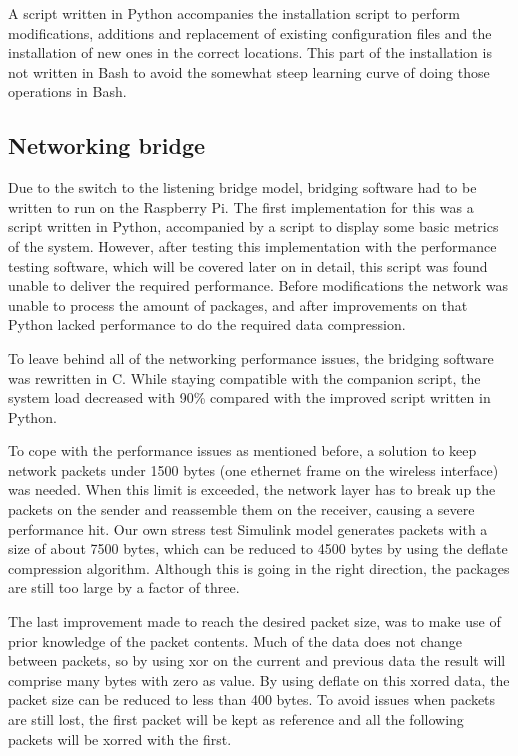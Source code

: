 A script written in Python accompanies the installation script to perform modifications, additions and replacement of existing configuration files and the installation of new ones in the correct locations. This part of the installation is not written in Bash to avoid the somewhat steep learning curve of doing those operations in Bash.

\subsection{Networking bridge}
Due to the switch to the listening bridge model, bridging software had to be written to run on the Raspberry Pi. The first implementation for this was a script written in Python, accompanied by a script to display some basic metrics of the system. However, after testing this implementation with the performance testing software, which will be covered later on in detail, this script was found unable to deliver the required performance. Before modifications the network was unable to process the amount of packages, and after improvements on that Python lacked performance to do the required data compression.

To leave behind all of the networking performance issues, the bridging software was rewritten in C. While staying compatible with the companion script, the system load decreased with 90\% compared with the improved script written in Python.

To cope with the performance issues as mentioned before, a solution to keep network packets under 1500 bytes (one ethernet frame on the wireless interface) was needed. When this limit is exceeded, the network layer has to break up the packets on the sender and reassemble them on the receiver, causing a severe performance hit. Our own stress test Simulink model generates packets with a size of about 7500 bytes, which can be reduced to 4500 bytes by using the deflate compression algorithm. Although this is going in the right direction, the packages are still too large by a factor of three.

The last improvement made to reach the desired packet size, was to make use of prior knowledge of the packet contents. Much of the data does not change between packets, so by using xor on the current and previous data the result will comprise many bytes with zero as value. By using deflate on this xorred data, the packet size can be reduced to less than 400 bytes. To avoid issues when packets are still lost, the first packet will be kept as reference and all the following packets will be xorred with the first.

